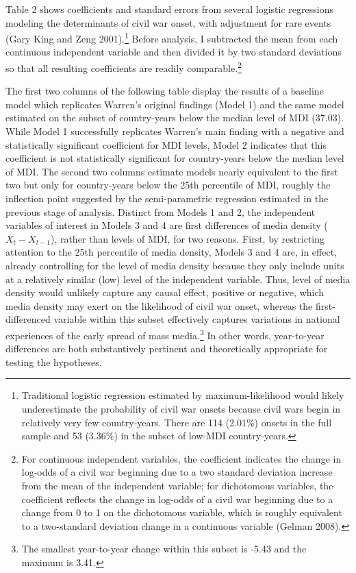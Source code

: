 \documentclass[11pt,article,oneside]{memoir}
\begin{document}
Table 2 shows coefficients and standard errors from several logistic
regressions modeling the determinants of civil war onset, with
adjustment for rare events (Gary King and Zeng 2001).\footnote{Traditional
  logistic regression estimated by maximum-likelihood would likely
  underestimate the probability of civil war onsets because civil wars
  begin in relatively very few country-years. There are 114 (2.01\%)
  onsets in the full sample and 53 (3.36\%) in the subset of low-MDI
  country-years.} Before analysis, I subtracted the mean from each
continuous independent variable and then divided it by two standard
deviations so that all resulting coefficients are readily
comparable.\footnote{For continuous independent variables, the
  coefficient indicates the change in log-odds of a civil war beginning
  due to a two standard deviation increase from the mean of the
  independent variable; for dichotomous variables, the coefficient
  reflects the change in log-odds of a civil war beginning due to a
  change from 0 to 1 on the dichotomous variable, which is roughly
  equivalent to a two-standard deviation change in a continuous variable
  (Gelman 2008).}

The first two columns of the following table display the results of a
baseline model which replicates Warren's original findings (Model 1) and
the same model estimated on the subset of country-years below the median
level of MDI (37.03). While Model 1 successfully replicates Warren's
main finding with a negative and statistically significant coefficient
for MDI levels, Model 2 indicates that this coefficient is not
statistically significant for country-years below the median level of
MDI. The second two columns estimate models nearly equivalent to the
first two but only for country-years below the 25th percentile of MDI,
roughly the inflection point suggested by the semi-parametric regression
estimated in the previous stage of analysis. Distinct from Models 1 and
2, the independent variables of interest in Models 3 and 4 are first
differences of media density ($X_{t} - X_{t-1}$), rather than levels of
MDI, for two reasons. First, by restricting attention to the 25th
percentile of media density, Models 3 and 4 are, in effect, already
controlling for the level of media density because they only include
units at a relatively similar (low) level of the independent variable.
Thus, level of media density would unlikely capture any causal effect,
positive or negative, which media density may exert on the likelihood of
civil war onset, whereas the first-differenced variable within this
subset effectively captures variations in national experiences of the
early spread of mass media.\footnote{The smallest year-to-year change
  within this subset is -5.43 and the maximum is 3.41.} In other words,
year-to-year differences are both substantively pertinent and
theoretically appropriate for testing the hypotheses.
\end{document}
